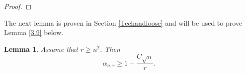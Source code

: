 \documentclass[10pt, twoside, leqno]{article}
\newtheorem{lemma}[thm]{Lemma}
\theoremstyle{definition}
\numberwithin{equation}{section}
\newcommand{\be}{\begin{equation}}
\newcommand{\ee}{\end{equation}}
\begin{document}
\begin{proof}
\end{proof}
The next lemma is proven in Section \ref{Techandloose} and will be used to prove Lemma \ref{3.9} below.
\begin{lemma}{\label{tech_lemma}}
	Assume that $ r\geq n^2 $. Then %
	\be
	\alpha_{n,r} \geq 1-\frac{C\sqrt{n}}{r}	.
	\ee
\end{lemma}
\end{document}
